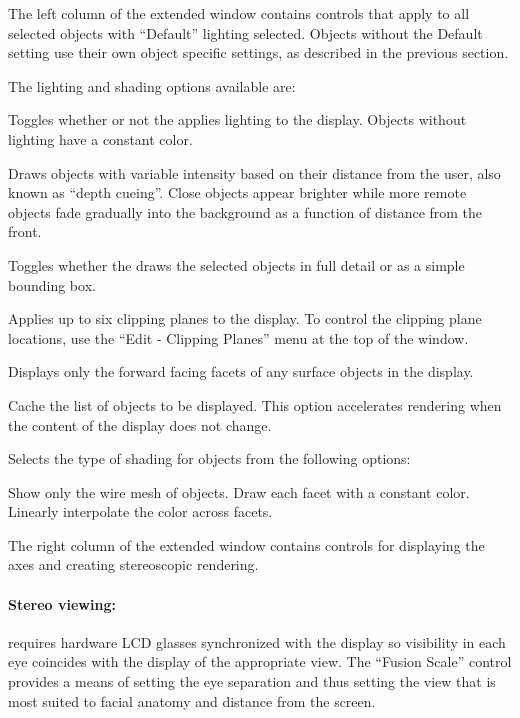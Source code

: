 The left column of the extended \viewer{} window contains controls that
apply to all selected objects with ``Default'' lighting selected.
Objects without the Default setting use their own object specific
settings, as described in the previous section.  

The lighting and shading options available are:
%
\begin{description}
   Toggles whether or not the \viewer{} applies
  lighting to the display.  Objects without lighting have a constant
  color.
        
   Draws objects with variable intensity based on their
  distance from the user, also known as ``depth cueing''.  Close
  objects appear brighter while more remote objects fade gradually
  into the background as a function of distance from the front.
  
   Toggles whether the \viewer{} draws the selected
  objects in full detail or as a simple bounding box.
  
   Applies up to six clipping planes to the
  display.  To control the clipping plane locations, use the ``Edit
  -\ra{} Clipping Planes'' menu at the top of the \viewer{} window.
  
   Displays only the forward facing facets of any
  surface objects in the display.
  
   Cache the list of objects to be displayed.
  This option accelerates rendering when the content of the display
  does not change.

   Selects the type of shading for objects from the
        following options:
        \begin{description}
           Show only the wire mesh of objects.
           Draw each facet with a constant color.
           Linearly interpolate the color across facets. 
        \end{description}
\end{description}

The right column of the extended \viewer{} window contains controls
for displaying the axes and creating stereoscopic rendering.  

\paragraph{Stereo viewing: } requires hardware LCD glasses synchronized
with the display so visibility in each eye coincides with the
display of the appropriate view.  The ``Fusion Scale'' control provides a
means of setting the eye separation and thus setting the view that is most
suited to facial anatomy and distance from the screen.

